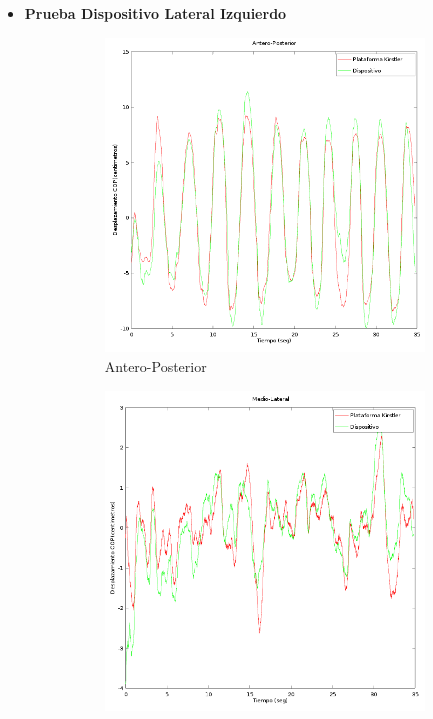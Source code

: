 \documentclass[12pt,a4paper]{article}
\begin{document}
\begin{itemize}
	\item \textbf{Prueba Dispositivo Lateral Izquierdo }
	
	\begin{figure}[H]
		\centering
		\begin{subfigure}{.5\textwidth}
			\centering
			\includegraphics[width=1\linewidth]{images/pruebas/LateralIzquierdo/Antero-Posterior}
			\caption{Antero-Posterior}
			\label{fig:anteroPosteriorLateral}
		\end{subfigure}%
		\begin{subfigure}{.5\textwidth}
			\centering
			\includegraphics[width=1\linewidth]{images/pruebas/LateralIzquierdo/Medio-Lateral}

\end{subfigure}
\end{figure}
\end{itemize}
\end{document}
